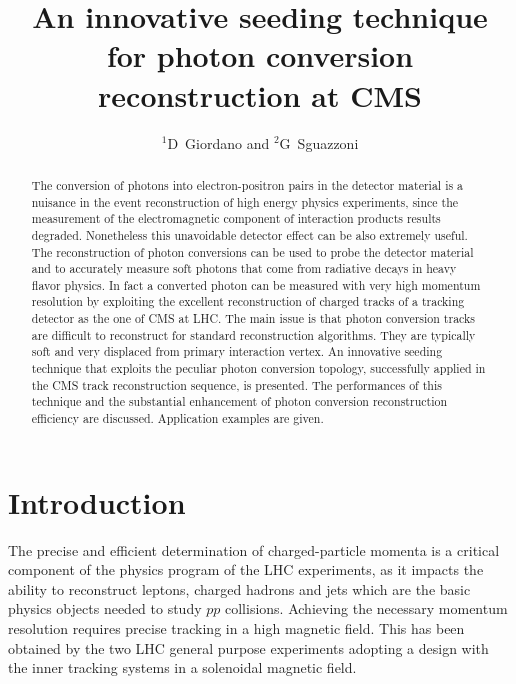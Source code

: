 \documentclass[a4paper]{jpconf}
\begin{document}
\title{An innovative seeding technique for photon conversion reconstruction at CMS}

\author{$^1$D~Giordano and $^2$G~Sguazzoni}

\address{$^1$CERN, Information Technology Department, Experiment Support Group, Geneva, Switzerland}
\address{$^2$INFN, Firenze, Italy}



\begin{abstract}
The conversion of photons into electron-positron pairs in the detector material is a nuisance in the event reconstruction of high energy physics experiments, since the measurement of the electromagnetic component of interaction products results degraded. Nonetheless this unavoidable detector effect can be also extremely useful. The reconstruction of photon conversions can be used to probe the detector material and to accurately measure soft photons that come from radiative decays in heavy flavor physics. In fact a converted photon can be measured with very high momentum resolution by exploiting the excellent reconstruction of charged tracks of a tracking detector as the one of CMS at LHC. The main issue is that photon conversion tracks are difficult to reconstruct for standard reconstruction algorithms. They are typically soft and very displaced from primary interaction vertex. An innovative seeding technique that exploits the peculiar photon conversion topology, successfully applied in the CMS track reconstruction sequence, is presented. The performances of this technique and the substantial enhancement of photon conversion reconstruction efficiency are discussed. Application examples are given.
\end{abstract}


\section{Introduction}
\label{introductions}

The precise and efficient determination of charged-particle momenta is a
critical component of the physics program of the LHC experiments, 
as it impacts the ability to
reconstruct leptons, charged hadrons and jets which
are the basic physics objects needed to study $pp$ collisions.
Achieving the necessary momentum resolution requires precise tracking in a high magnetic field. This has been obtained by  the two LHC general purpose experiments    adopting a design with the inner tracking systems in a solenoidal magnetic field.
\end{document}

